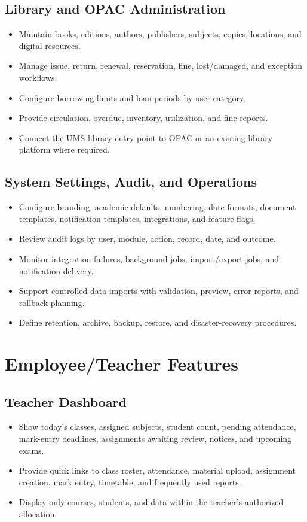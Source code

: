 \documentclass[10pt,a4paper]{article}
\begin{document}
\subsection{Library and OPAC Administration}
\begin{itemize}
  \item Maintain books, editions, authors, publishers, subjects, copies, locations, and digital resources.
  \item Manage issue, return, renewal, reservation, fine, lost/damaged, and exception workflows.
  \item Configure borrowing limits and loan periods by user category.
  \item Provide circulation, overdue, inventory, utilization, and fine reports.
  \item Connect the UMS library entry point to OPAC or an existing library platform where required.
\end{itemize}

\subsection{System Settings, Audit, and Operations}
\begin{itemize}
  \item Configure branding, academic defaults, numbering, date formats, document templates,
        notification templates, integrations, and feature flags.
  \item Review audit logs by user, module, action, record, date, and outcome.
  \item Monitor integration failures, background jobs, import/export jobs, and notification delivery.
  \item Support controlled data imports with validation, preview, error reports, and rollback planning.
  \item Define retention, archive, backup, restore, and disaster-recovery procedures.
\end{itemize}

\newpage
\section{Employee/Teacher Features}

\subsection{Teacher Dashboard}
\begin{itemize}
  \item Show today's classes, assigned subjects, student count, pending attendance,
        mark-entry deadlines, assignments awaiting review, notices, and upcoming exams.
  \item Provide quick links to class roster, attendance, material upload, assignment creation,
        mark entry, timetable, and frequently used reports.
  \item Display only courses, students, and data within the teacher's authorized allocation.
\end{itemize}
\end{document}
